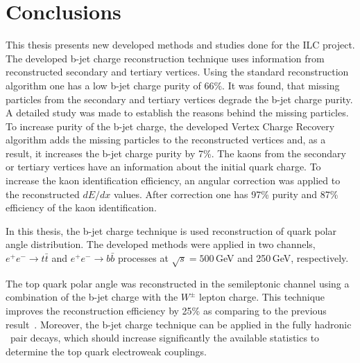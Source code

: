 \section*{Conclusions}
This thesis presents new developed methods and studies done for the ILC project.
The developed b-jet charge reconstruction technique uses information from reconstructed secondary and tertiary vertices. 
Using the standard reconstruction algorithm one has a low b-jet charge purity of 66\%.
It was found, that missing particles from the secondary and tertiary vertices degrade the b-jet charge purity. 
A detailed study was made to establish the reasons behind the missing particles. 
To increase purity of the b-jet charge, the developed Vertex Charge Recovery algorithm adds the missing particles to the reconstructed vertices and, as a result, it increases the b-jet charge purity by 7\%.
The kaons from the secondary or tertiary vertices have an information about the initial quark charge. 
To increase the kaon identification efficiency, an angular correction was applied to the reconstructed $dE/dx$ values. 
After correction one has 97\% purity and 87\% efficiency of the kaon identification.

In this thesis, the b-jet charge technique is used reconstruction of quark polar angle distribution.
The developed methods were applied in two channels, $e^+e^-\to t\bar{t}$ and $e^+e^-\to b\bar{b}$ processes at $\sqrt{s} = 500$\,GeV and 250\,GeV, respectively.

The top quark polar angle was reconstructed in the semileptonic channel using a combination of the b-jet charge with the $W^\pm$ lepton charge. 
This technique improves the reconstruction efficiency by 25\% as comparing to the previous result~\cite{bib:ILCTOP}.
Moreover, the b-jet charge technique can be applied in the fully hadronic \ttbar\ pair decays, which should increase significantly the available statistics to determine the top quark electroweak couplings. 

